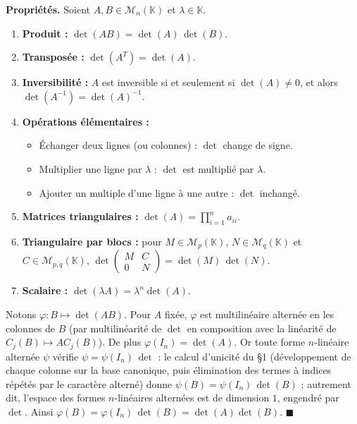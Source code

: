 \begin{tcolorbox}[thmbox]
  \textbf{Propriétés.}\enspace%
  Soient $A, B \in \mathcal{M}_n(\mathbb{K})$ et $\lambda \in \mathbb{K}$.
  \begin{enumerate}
    \item \textbf{Produit :} $\det(AB) = \det(A)\,\det(B)$.
    \item \textbf{Transposée :} $\det(A^T) = \det(A)$.
    \item \textbf{Inversibilité :} $A$ est inversible si et seulement si
          $\det(A) \neq 0$, et alors $\det(A^{-1}) = {\det(A)}^{-1}$.
    \item \textbf{Opérations élémentaires :}
    \begin{itemize}
      \item Échanger deux lignes (ou colonnes) : $\det$ change de signe.
      \item Multiplier une ligne par $\lambda$ : $\det$ est multiplié par $\lambda$.
      \item Ajouter un multiple d'une ligne à une autre : $\det$ inchangé.
    \end{itemize}
    \item \textbf{Matrices triangulaires :} $\det(A) = \prod_{i=1}^n a_{ii}$.
    \item \textbf{Triangulaire par blocs :} pour $M \in \mathcal{M}_p(\mathbb{K})$,
          $N \in \mathcal{M}_q(\mathbb{K})$ et $C \in \mathcal{M}_{p,q}(\mathbb{K})$,
          $\det\begin{pmatrix} M & C \\ 0 & N \end{pmatrix} = \det(M)\,\det(N)$.
    \item \textbf{Scalaire :} $\det(\lambda A) = \lambda^n \det(A)$.
  \end{enumerate}
\end{tcolorbox}


\begin{mdframed}[style=proofbar]
  Notons $\varphi : B \mapsto \det(AB)$. Pour $A$ fixée, $\varphi$ est
  multilinéaire alternée en les colonnes de $B$ (par multilinéarité de $\det$
  en composition avec la linéarité de $C_j(B)\mapsto AC_j(B)$).
  De plus $\varphi(I_n) = \det(A)$.
  Or toute forme $n$-linéaire alternée $\psi$ vérifie $\psi = \psi(I_n)\,\det$ :
  le calcul d'unicité du §1 (développement de chaque colonne sur la base
  canonique, puis élimination des termes à indices répétés par le caractère
  alterné) donne $\psi(B) = \psi(I_n)\,\det(B)$ ; autrement dit, l'espace des
  formes $n$-linéaires alternées est de dimension $1$, engendré par $\det$.
  Ainsi $\varphi(B) = \varphi(I_n)\,\det(B) = \det(A)\det(B)$. \hfill$\blacksquare$
\end{mdframed}

